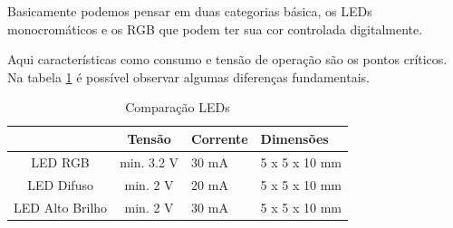 Basicamente podemos pensar em duas categorias básica, os LEDs monocromáticos e os RGB que podem ter sua cor controlada digitalmente.

Aqui características como consumo e tensão de operação são os pontos críticos. Na tabela \ref{tab:leds} é possível observar algumas diferenças fundamentais.

\begin{table}[h!]
\centering
\begin{tabular}{|c|c|l|l|}
\hline
      			& Tensão 		& Corrente& Dimensões 		\\ \hline
LED RGB 		& min. 3.2 V 	&	30 mA & 5 x 5 x 10 mm \\ \hline
LED Difuso 		& min. 2 V  	&   20 mA & 5 x 5 x 10 mm \\ \hline
LED Alto Brilho & min. 2 V 		&	30 mA & 5 x 5 x 10 mm \\ \hline
\end{tabular}
\caption{Comparação LEDs}
\label{tab:leds}
\end{table}


